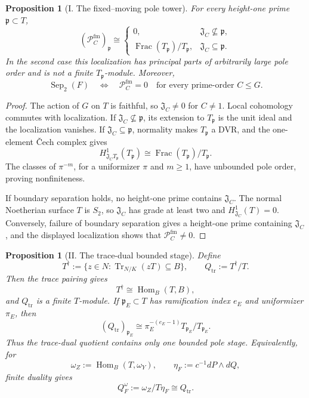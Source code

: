 \documentclass[11pt]{article}
\newtheorem{proposition}[theorem]{Proposition}
\theoremstyle{remark}
\theoremstyle{definition}
\DeclareMathOperator{\Frac}{Frac}
\begin{document}
\begin{proposition}[I. The fixed--moving pole tower]
\label{prop:fixed-moving-pole-tower}
For every height-one prime \(\mathfrak p\subset T\),
\[
  \left(\mathcal P_C^{\mathrm{fm}}\right)_{\mathfrak p}
  \cong
  \begin{cases}
    0,&\mathfrak J_C\nsubseteq\mathfrak p,\\[2pt]
    \Frac(T_{\mathfrak p})/T_{\mathfrak p},
      &\mathfrak J_C\subseteq\mathfrak p.
  \end{cases}
\]
In the second case this localization has principal parts of arbitrarily
large pole order and is not a finite \(T_{\mathfrak p}\)-module.  Moreover,
\[
  \operatorname{Sep}_2(F)
  \quad\Longleftrightarrow\quad
  \mathcal P_C^{\mathrm{fm}}=0
  \quad\text{for every prime-order }C\leq G.
\]
\end{proposition}

\begin{proof}
The action of \(G\) on \(T\) is faithful, so \(\mathfrak J_C\neq0\) for
\(C\neq1\).  Local cohomology commutes with localization.  If
\(\mathfrak J_C\nsubseteq\mathfrak p\), its extension to
\(T_{\mathfrak p}\) is the unit ideal and the localization vanishes.  If
\(\mathfrak J_C\subseteq\mathfrak p\), normality makes
\(T_{\mathfrak p}\) a DVR, and the one-element \v{C}ech complex gives
\[
  H^1_{\mathfrak J_CT_{\mathfrak p}}(T_{\mathfrak p})
  \cong \Frac(T_{\mathfrak p})/T_{\mathfrak p}.
\]
The classes of \(\pi^{-m}\), for a uniformizer \(\pi\) and \(m\geq1\),
have unbounded pole order, proving nonfiniteness.

If boundary separation holds, no height-one prime contains
\(\mathfrak J_C\).  The normal Noetherian surface \(T\) is \(S_2\), so
\(\mathfrak J_C\) has grade at least two and
\(H^1_{\mathfrak J_C}(T)=0\).  Conversely, failure of boundary separation
gives a height-one prime containing \(\mathfrak J_C\), and the displayed
localization shows that \(\mathcal P_C^{\mathrm{fm}}\neq0\).
\end{proof}

\begin{proposition}[II. The trace-dual bounded stage]
\label{prop:trace-dual-bounded-stage}
Define
\[
  T^\dagger
  :=\{z\in N:\operatorname{Tr}_{N/K}(zT)\subseteq B\},
  \qquad
  Q_{\mathrm{tr}}:=T^\dagger/T.
\]
Then the trace pairing gives
\[
  T^\dagger\cong\operatorname{Hom}_B(T,B),
\]
and \(Q_{\mathrm{tr}}\) is a finite \(T\)-module.  If
\(\mathfrak p_E\subset T\) has ramification index \(e_E\) and uniformizer
\(\pi_E\), then
\[
  (Q_{\mathrm{tr}})_{\mathfrak p_E}
  \cong
  \pi_E^{-(e_E-1)}T_{\mathfrak p_E}/T_{\mathfrak p_E}.
\]
Thus the trace-dual quotient contains only one bounded pole stage.
Equivalently, for
\[
  \omega_Z:=\operatorname{Hom}_B(T,\omega_Y),
  \qquad
  \eta_F:=c^{-1}dP\wedge dQ,
\]
finite duality gives
\[
  Q_F^{\omega}
  :=\omega_Z/T\eta_F
  \cong Q_{\mathrm{tr}}.
\]
\end{proposition}
\end{document}
